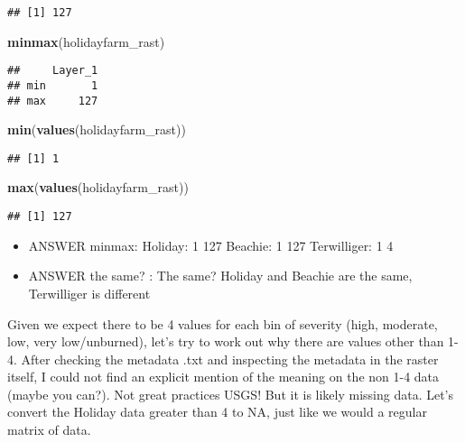 \documentclass[
]{article}
\newenvironment{Shaded}{\begin{snugshade}}{\end{snugshade}}
\newcommand{\FunctionTok}[1]{\textcolor[rgb]{0.13,0.29,0.53}{\textbf{#1}}}
\newcommand{\NormalTok}[1]{#1}
\providecommand{\tightlist}{%
  \setlength{\itemsep}{0pt}\setlength{\parskip}{0pt}}
\begin{document}
\begin{verbatim}
## [1] 127
\end{verbatim}

\begin{Shaded}
\begin{Highlighting}[]
\FunctionTok{minmax}\NormalTok{(holidayfarm\_rast)}
\end{Highlighting}
\end{Shaded}

\begin{verbatim}
##     Layer_1
## min       1
## max     127
\end{verbatim}

\begin{Shaded}
\begin{Highlighting}[]
\FunctionTok{min}\NormalTok{(}\FunctionTok{values}\NormalTok{(holidayfarm\_rast))}
\end{Highlighting}
\end{Shaded}

\begin{verbatim}
## [1] 1
\end{verbatim}

\begin{Shaded}
\begin{Highlighting}[]
\FunctionTok{max}\NormalTok{(}\FunctionTok{values}\NormalTok{(holidayfarm\_rast))}
\end{Highlighting}
\end{Shaded}

\begin{verbatim}
## [1] 127
\end{verbatim}

\begin{itemize}
\tightlist
\item
  ANSWER minmax: Holiday: 1 127 Beachie: 1 127 Terwilliger: 1 4
\item
  ANSWER the same? : The same? Holiday and Beachie are the same,
  Terwilliger is different
\end{itemize}

Given we expect there to be 4 values for each bin of severity (high,
moderate, low, very low/unburned), let's try to work out why there are
values other than 1-4. After checking the metadata .txt and inspecting
the metadata in the raster itself, I could not find an explicit mention
of the meaning on the non 1-4 data (maybe you can?). Not great practices
USGS! But it is likely missing data. Let's convert the Holiday data
greater than 4 to NA, just like we would a regular matrix of data.
\end{document}
